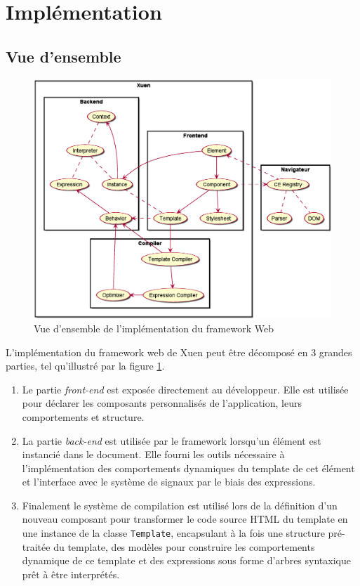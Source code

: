 \section{Implémentation}

\subsection{Vue d'ensemble}
\begin{figure}[h]
	\centering
	\includegraphics[width=\textwidth]{img/web_overview.eps}
	\caption{Vue d'ensemble de l'implémentation du framework Web}
	\label{fig:web-overview}
\end{figure}

L'implémentation du framework web de Xuen peut être décomposé en 3 grandes parties, tel qu'illustré par la figure \ref{fig:web-overview}.

\begin{enumerate}
	\item Le partie \emph{front-end} est exposée directement au développeur. Elle est utilisée pour déclarer les composants personnalisés de l'application, leurs comportements et structure.
	\item La partie \emph{back-end} est utilisée par le framework lorsqu'un élément est instancié dans le document. Elle fourni les outils nécessaire à l'implémentation des comportements dynamiques du template de cet élément et l'interface avec le système de signaux par le biais des expressions.
	\item Finalement le système de compilation est utilisé lors de la définition d'un nouveau composant pour transformer le code source HTML du template en une instance de la classe \texttt{Template}, encapsulant à la fois une structure pré-traitée du template, des modèles pour construire les comportements dynamique de ce template et des expressions sous forme d'arbres syntaxique prêt à être interprétés.  
\end{enumerate}

